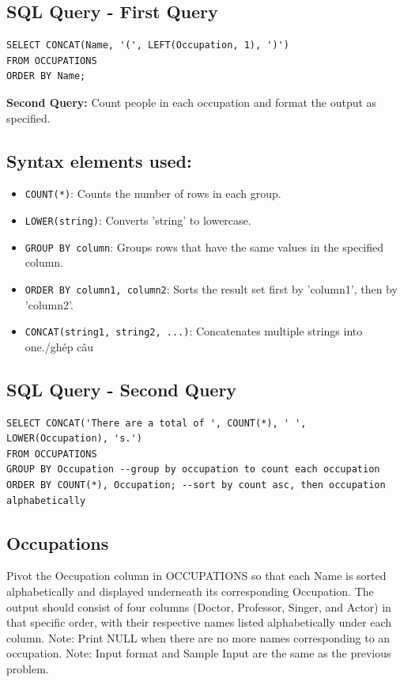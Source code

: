 \documentclass[12pt,a4paper]{article}
\begin{document}
\subsection*{SQL Query - First Query}
\begin{lstlisting}[style=sqlstyle]
SELECT CONCAT(Name, '(', LEFT(Occupation, 1), ')')
FROM OCCUPATIONS
ORDER BY Name;
\end{lstlisting}
\textbf{Second Query:}
Count people in each occupation and format the output as specified.
\subsection*{Syntax elements used:}
\begin{itemize}
    \item \texttt{COUNT(*)}: Counts the number of rows in each group.
    \item \texttt{LOWER(string)}: Converts 'string' to lowercase.
    \item \texttt{GROUP BY column}: Groups rows that have the same values in the specified column.
    \item \texttt{ORDER BY column1, column2}: Sorts the result set first by 'column1', then by 'column2'.
    \item \texttt{CONCAT(string1, string2, ...)}: Concatenates multiple strings into one./ghép câu
\end{itemize}
\subsection*{SQL Query - Second Query}
\begin{lstlisting}[style=sqlstyle]
SELECT CONCAT('There are a total of ', COUNT(*), ' ', LOWER(Occupation), 's.')
FROM OCCUPATIONS
GROUP BY Occupation --group by occupation to count each occupation
ORDER BY COUNT(*), Occupation; --sort by count asc, then occupation alphabetically
\end{lstlisting}
\subsection{Occupations}
Pivot the Occupation column in OCCUPATIONS so that each Name is sorted alphabetically and displayed underneath its corresponding Occupation. The output should consist of four columns (Doctor, Professor, Singer, and Actor) in that specific order, with their respective names listed alphabetically under each column.\newline
Note: Print NULL when there are no more names corresponding to an occupation.\newline
Note: Input format and Sample Input are the same as the previous problem.
\end{document}
